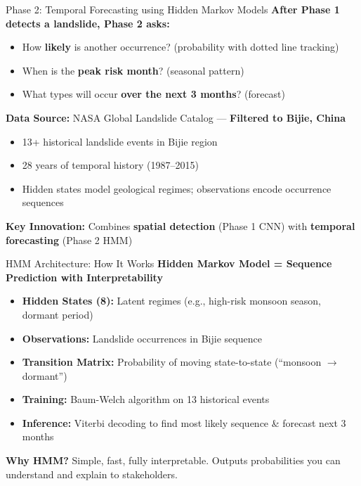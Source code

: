 \documentclass[aspectratio=169]{beamer}
\begin{document}

\begin{frame}{Phase 2: Temporal Forecasting using Hidden Markov Models}
    \textbf{After Phase 1 detects a landslide, Phase 2 asks:}
    \begin{itemize}
        \item How \textbf{likely} is another occurrence? (probability with dotted line tracking)
        \item When is the \textbf{peak risk month}? (seasonal pattern)
        \item What types will occur \textbf{over the next 3 months}? (forecast)
    \end{itemize}

    \vspace{0.4cm}
    \textbf{Data Source:} NASA Global Landslide Catalog --- \textbf{Filtered to Bijie, China}
    \begin{itemize}
        \item 13+ historical landslide events in Bijie region
        \item 28 years of temporal history (1987--2015)
        \item Hidden states model geological regimes; observations encode occurrence sequences
    \end{itemize}

    \vspace{0.3cm}
    \textbf{Key Innovation:} Combines \textbf{spatial detection} (Phase 1 CNN) with \textbf{temporal forecasting} (Phase 2 HMM)
\end{frame}

\begin{frame}{HMM Architecture: How It Works}
    \textbf{Hidden Markov Model = Sequence Prediction with Interpretability}
    
    \begin{itemize}
        \item \textbf{Hidden States (8):} Latent regimes (e.g., high-risk monsoon season, dormant period)
        \item \textbf{Observations:} Landslide occurrences in Bijie sequence
        \item \textbf{Transition Matrix:} Probability of moving state-to-state (``monsoon $\to$ dormant'')
        \item \textbf{Training:} Baum-Welch algorithm on 13 historical events
        \item \textbf{Inference:} Viterbi decoding to find most likely sequence \& forecast next 3 months
    \end{itemize}

    \vspace{0.4cm}
    \textbf{Why HMM?} Simple, fast, fully interpretable. Outputs probabilities you can understand and explain to stakeholders.
\end{frame}
\end{document}
